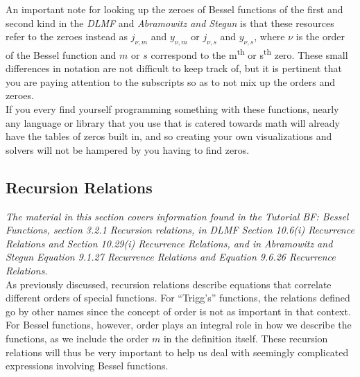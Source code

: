 \documentclass[11pt]{report}
\begin{document}
An important note for looking up the zeroes of Bessel functions of the first and second kind in the \emph{DLMF} and \emph{Abramowitz and Stegun} is that these resources refer to the zeroes instead as $j_{\nu,m}$ and $y_{\nu,m}$ or $j_{\nu,s}$ and $y_{\nu,s}$, where $\nu$ is the order of the Bessel function and $m$ or $s$ correspond to the m\textsuperscript{th} or s\textsuperscript{th} zero. These small differences in notation are not difficult to keep track of, but it is pertinent that you are paying attention to the subscripts so as to not mix up the orders and zeroes.\\

If you every find yourself programming something with these functions, nearly any language or library that you use that is catered towards math will already have the tables of zeros built in, and so creating your own visualizations and solvers will not be hampered by you having to find zeros.  

\subsection{Recursion Relations}

\emph{The material in this section covers information found in the Tutorial BF: Bessel Functions, section 3.2.1 Recursion relations, in DLMF Section 10.6(i) Recurrence Relations and Section 10.29(i) Recurrence Relations, and in Abramowitz and Stegun Equation 9.1.27 Recurrence Relations and Equation 9.6.26 Recurrence Relations.}\\


As previously discussed, recursion relations describe equations that correlate different orders of special functions. For ``Trigg's'' functions, the relations defined go by other names since the concept of order is not as important in that context. For Bessel functions, however, order plays an integral role in how we describe the functions, as we include the order $m$ in the definition itself. These recursion relations will thus be very important to help us deal with seemingly complicated expressions involving Bessel functions.\\
\end{document}
